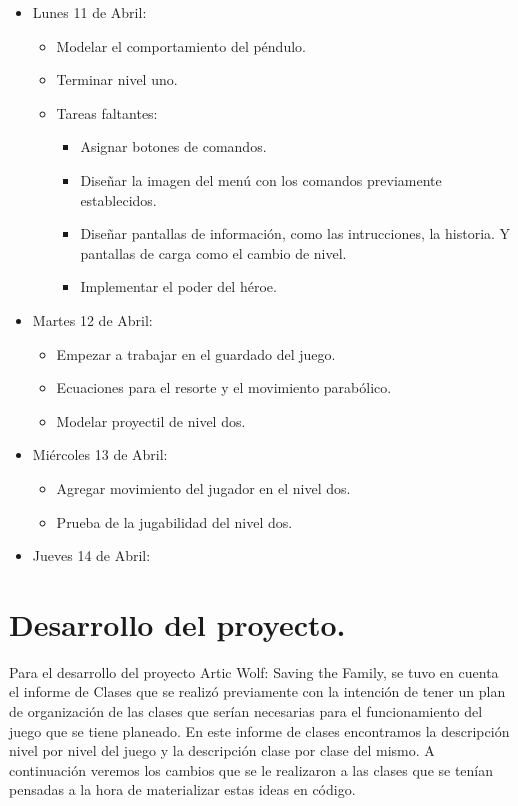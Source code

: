 \documentclass{article}
\begin{document}
\begin{itemize}
    \item Lunes 11 de Abril:
    \begin{itemize}
        \item Modelar el comportamiento del péndulo.
        \item Terminar nivel uno.
        
        \item Tareas faltantes:
        \begin{itemize}
            \item Asignar botones de comandos.
            \item Diseñar la imagen del menú con los comandos previamente establecidos.
            \item Diseñar pantallas de información, como las intrucciones, la historia. Y pantallas de carga como el cambio de nivel.
            \item Implementar el poder del héroe.
        \end{itemize}
    \end{itemize}
    
    \item Martes 12 de Abril:
    \begin{itemize}
        \item Empezar a trabajar en el guardado del juego.
        \item Ecuaciones para el resorte y el movimiento parabólico.
        \item Modelar proyectil de nivel dos.
    \end{itemize}
    
    \item Miércoles 13 de Abril:
    \begin{itemize}
        \item Agregar movimiento del jugador en el nivel dos.
        \item Prueba de la jugabilidad del nivel dos.
    \end{itemize}
    
    \item Jueves 14 de Abril:
    \begin{itemize}
    
    \end{itemize}
    
    
\end{itemize}

\section{Desarrollo del proyecto.}
Para el desarrollo del proyecto Artic Wolf: Saving the Family, se tuvo en cuenta el informe de Clases que se realizó previamente con la intención de tener un plan de organización de las clases que serían necesarias para el funcionamiento del juego que se tiene planeado. En este informe de clases encontramos la descripción nivel por nivel del juego y la descripción clase por clase del mismo. A continuación veremos los cambios que se le realizaron a las clases que se tenían pensadas a la hora de materializar estas ideas en código.
\end{document}
